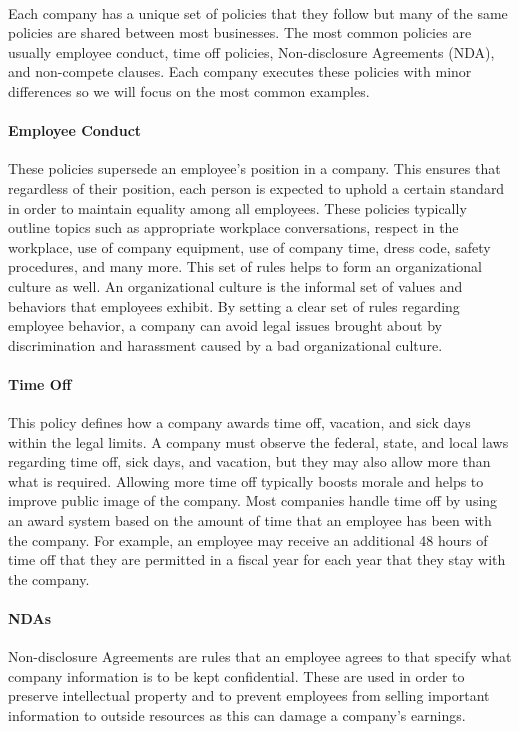 \documentclass[notitlepage,a4paper,12pt]{article}
\begin{document}
\paragraph{}Each company has a unique set of policies that they follow but many of the same policies are shared between most businesses. The most common policies are usually employee conduct, time off policies, Non-disclosure Agreements (NDA), and non-compete clauses. Each company executes these policies with minor differences so we will focus on the most common examples.
\paragraph{Employee Conduct}These policies supersede an employee's position in a company. This ensures that regardless of their position, each person is expected to uphold a certain standard in order to maintain equality among all employees. These policies typically outline topics such as appropriate workplace conversations, respect in the workplace, use of company equipment, use of company time, dress code, safety procedures, and many more. This set of rules helps to form an organizational culture as well. An organizational culture is the informal set of values and behaviors that employees exhibit. By setting a clear set of rules regarding employee behavior, a company can avoid legal issues brought about by discrimination and harassment caused by a bad organizational culture.
\paragraph{Time Off}This policy defines how a company awards time off, vacation, and sick days within the legal limits. A company must observe the federal, state, and local laws regarding time off, sick days, and vacation, but they may also allow more than what is required. Allowing more time off typically boosts morale and helps to improve public image of the company. Most companies handle time off by using an award system based on the amount of time that an employee has been with the company. For example, an employee may receive an additional 48 hours of time off that they are permitted in a fiscal year for each year that they stay with the company.
\paragraph{NDAs}Non-disclosure Agreements are rules that an employee agrees to that specify what company information is to be kept confidential. These are used in order to preserve intellectual property and to prevent employees from selling important information to outside resources as this can damage a company's earnings.
\end{document}
